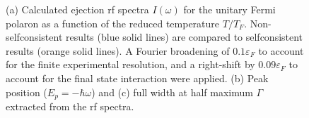 \begin{figure}[htb]
\begin{minipage}[t]{.49\textwidth}
		\raggedleft
	\end{minipage}
	\caption[Rf spectra of the unitary Fermi polaron]{(a) Calculated ejection rf spectra $I(\omega)$ for the unitary Fermi polaron as a function of the reduced temperature $T/T_F$. Non-selfconsistent results (blue solid lines) are compared to selfconsistent results (orange solid lines). A Fourier broadening of $0.1\varepsilon_F$ to account for the finite experimental resolution, and a right-shift by $0.09\varepsilon_F$ to account for the final state interaction were applied. (b) Peak position ($E_p=-\hbar\omega$) and (c) full width at half maximum $\Gamma$ extracted from the rf spectra.}
	\label{fig:rf-spectra-polaron}
\end{figure}